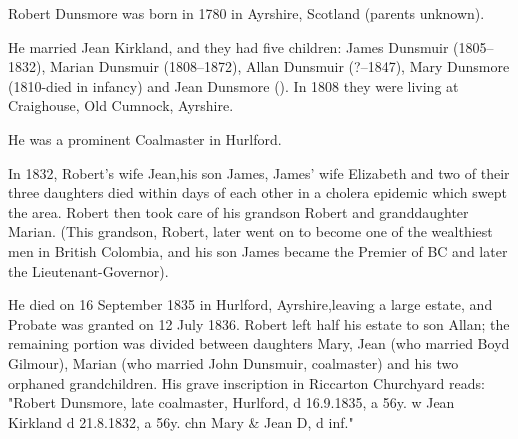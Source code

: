 
Robert Dunsmore was born in 1780 in Ayrshire, Scotland (parents unknown).  

He married Jean Kirkland, and they had five children: James Dunsmuir (1805--1832), Marian Dunsmuir (1808--1872), 
Allan Dunsmuir (?--1847), Mary Dunsmore (1810-died in infancy) and Jean Dunsmore (). In 1808 they were living at Craighouse, Old Cumnock, Ayrshire. \cite{RDunsmore1808}

He was a prominent Coalmaster in Hurlford. 

In 1832, Robert's wife Jean,his son James, James' wife Elizabeth and two of their three daughters died within days of each other in a cholera epidemic which swept the area. Robert then took care of his grandson Robert and granddaughter Marian. (This grandson, Robert, later went on to become one of the wealthiest men in British Colombia, and his son James became the Premier of BC and later the Lieutenant-Governor). 

He died on 16 September 1835 in Hurlford, Ayrshire,leaving a large estate,  and Probate was granted on 12 July 1836.\cite{RDunsmoreWill} Robert left half his estate to son Allan; the remaining portion was divided between daughters Mary, Jean (who married Boyd Gilmour), Marian (who married John Dunsmuir, coalmaster) and his two orphaned grandchildren.  His grave inscription in Riccarton Churchyard reads:
"Robert Dunsmore, late coalmaster, Hurlford, d 16.9.1835, a 56y. w Jean Kirkland d 21.8.1832, a 56y. chn Mary & Jean D, d inf."

